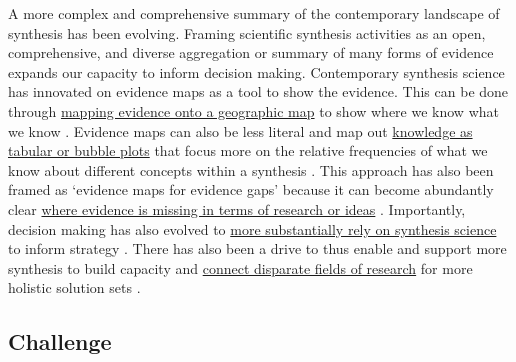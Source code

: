 \documentclass[
]{book}
\begin{document}
A more complex and comprehensive summary of the contemporary landscape of synthesis has been evolving. Framing scientific synthesis activities as an open, comprehensive, and diverse aggregation or summary of many forms of evidence expands our capacity to inform decision making. Contemporary synthesis science has innovated on evidence maps as a tool to show the evidence. This can be done through \href{https://www.nature.com/articles/528185a}{mapping evidence onto a geographic map} to show where we know what we know \citep{RN3621}. Evidence maps can also be less literal and map out \href{https://systematicreviewsjournal.biomedcentral.com/articles/10.1186/s13643-016-0204-x}{knowledge as tabular or bubble plots} that focus more on the relative frequencies of what we know about different concepts within a synthesis \citep{RN4430}. This approach has also been framed as `evidence maps for evidence gaps' because it can become abundantly clear \href{https://environmentalevidencejournal.biomedcentral.com/articles/10.1186/s13750-017-0096-9}{where evidence is missing in terms of research or ideas} \citep{RN5998}. Importantly, decision making has also evolved to \href{https://conbio.onlinelibrary.wiley.com/doi/full/10.1111/csp2.426}{more substantially rely on synthesis science} to inform strategy \citep{RN7304}. There has also been a drive to thus enable and support more synthesis to build capacity and \href{https://onlinelibrary.wiley.com/doi/full/10.1111/rec.13251}{connect disparate fields of research} for more holistic solution sets \citep{RN7323}.

\hypertarget{challenge}{%
\subsection*{Challenge}\label{challenge}}
\end{document}
